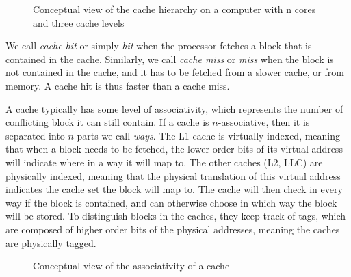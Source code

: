 \documentclass[a4paper,11pt,oneside]{report}
\begin{document}
\begin{figure}
    \centering
    \caption{Conceptual view of the cache hierarchy on a computer with n cores and three cache levels}
    \label{fig:cache_hierarchy}
\end{figure}

We call \emph{cache hit} or simply \emph{hit} when the processor fetches a block that is contained in the cache. Similarly, we call \emph{cache miss} or \emph{miss} when the block is not contained in the cache, and it has to be fetched from a slower cache, or from memory. A cache hit is thus faster than a cache miss.

A cache typically has some level of associativity, which represents the number of conflicting block it can still contain. If a cache is $n$-associative, then it is separated into $n$ parts we call \emph{ways}. The L1 cache is virtually indexed, meaning that when a block needs to be fetched, the lower order bits of its virtual address will indicate where in a way it will map to. The other caches (L2, LLC) are physically indexed, meaning that the physical translation of this virtual address indicates the cache set the block will map to. The cache will then check in every way if the block is contained, and can otherwise choose in which way the block will be stored. To distinguish blocks in the caches, they keep track of tags, which are composed of higher order bits of the physical addresses, meaning the caches are physically tagged.

\begin{figure}
    \centering
    \caption{Conceptual view of the associativity of a cache}
    \label{fig:cache_associativity}
\end{figure}
\end{document}
